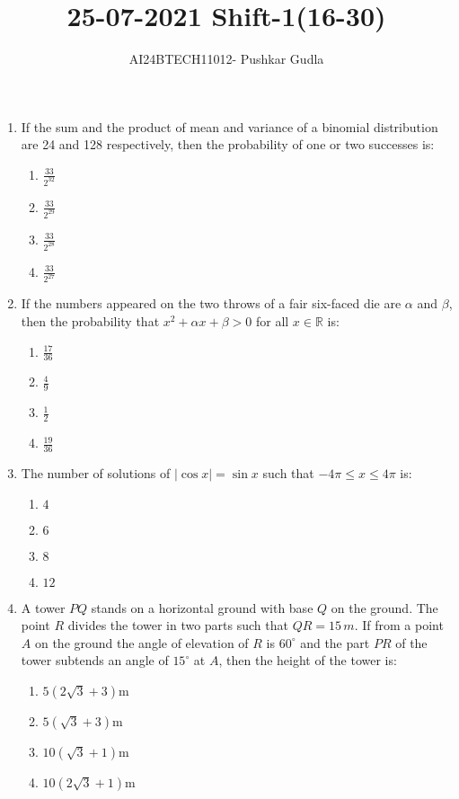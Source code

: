 \documentclass[journal,12pt,onecolumn]{IEEEtran}
\theoremstyle{remark}
\begin{document}

\vspace{3cm}

\title{\textbf{25-07-2021 Shift-1(16-30)}}
\author{AI24BTECH11012- Pushkar Gudla}
\maketitle
\bigskip

\renewcommand{\thefigure}{\theenumi}
\renewcommand{\thetable}{\theenumi}
\setlength{\columnsep}{2.5em}


\begin{enumerate}
    \item If the sum and the product of mean and variance of a binomial distribution are 24 and 128 respectively, then the probability of one or two successes is:
    \begin{enumerate}
        \item $\frac{33}{2^{32}}$
        \item $\frac{33}{2^{29}}$
        \item $\frac{33}{2^{28}}$
        \item $\frac{33}{2^{27}}$
    \end{enumerate}
    
    \item If the numbers appeared on the two throws of a fair six-faced die are $\alpha$ and $\beta$, then the probability that $x^2 + \alpha x + \beta > 0$ for all $x \in \mathbb{R}$ is:
    \begin{enumerate}
        \item $\frac{17}{36}$
        \item $\frac{4}{9}$
        \item $\frac{1}{2}$
        \item $\frac{19}{36}$
    \end{enumerate}

    \item The number of solutions of $|\cos x| = \sin x$ such that $-4\pi \leq x \leq 4\pi$ is:
    \begin{enumerate}
        \item $4$
        \item $6$
        \item $8$
        \item $12$
    \end{enumerate}

    \item A tower $PQ$ stands on a horizontal ground with base $Q$ on the ground. The point $R$ divides the tower in two parts such that $QR = 15 \, m$. If from a point $A$ on the ground the angle of elevation of $R$ is $60^\circ$ and the part $PR$ of the tower subtends an angle of $15^\circ$ at $A$, then the height of the tower is:
    \begin{enumerate}
        \item $5(2\sqrt{3} + 3)$m
        \item $5(\sqrt{3} + 3)$m
        \item $10(\sqrt{3} + 1)$m
        \item $10(2\sqrt{3} + 1)$m
    \end{enumerate}


\end{enumerate}
\end{document}
